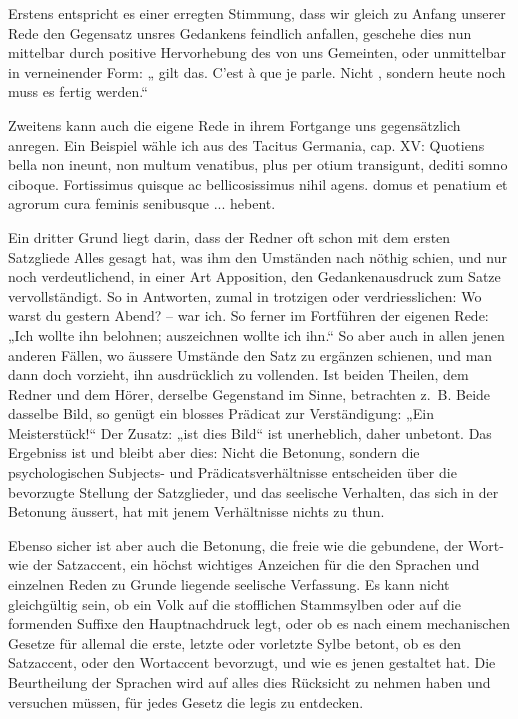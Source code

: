 \largerpage[2]Erstens entspricht es einer erregten Stimmung, dass wir gleich zu Anfang unserer Rede den Gegensatz unsres Gedankens feindlich anfallen, geschehe dies nun mittelbar durch positive Hervorhebung des von uns Gemeinten, oder unmittelbar in verneinender Form: „ gilt das. C’est à  que je parle. Nicht , sondern heute noch muss es fertig werden.“

Zweitens kann auch die eigene Rede in ihrem Fortgange uns gegensätzlich anregen. Ein Beispiel wähle ich aus des Tacitus Germania, cap. XV: Quotiens bella non ineunt, non multum venatibus, plus per otium transigunt, dediti somno ciboque. Fortissimus quisque ac bellicosissimus nihil agens.  domus et penatium et agrorum cura feminis senibusque ...  hebent.

Ein dritter Grund liegt darin, dass der Redner oft schon mit dem \label{fp.360} ersten Satzgliede Alles gesagt hat, was ihm den Umständen nach nöthig schien, und nur noch verdeutlichend, in einer Art Apposition, den Gedankenausdruck zum Satze vervollständigt. So in Antworten, zumal in trotzigen oder verdriesslichen: Wo warst du gestern Abend? –  war ich. So ferner im Fortführen der eigenen Rede: „Ich wollte ihn belohnen; auszeichnen wollte ich ihn.“ So aber auch in allen jenen anderen Fällen, wo äussere Umstände den Satz zu er\label{sp.376}gänzen schienen, und man dann doch vorzieht, ihn ausdrücklich zu vollenden. Ist beiden Theilen, dem Redner und dem Hörer, derselbe Gegenstand im Sinne, betrachten z.~B. Beide dasselbe Bild, so genügt ein blosses Prädicat zur Verständigung: „Ein Meisterstück!“ Der Zusatz: „ist dies Bild“ ist unerheblich, daher unbetont. Das Ergebniss ist und bleibt aber dies: Nicht die Betonung, sondern die psychologischen Subjects- und Prädicatsverhältnisse entscheiden über die bevorzugte Stellung der Satzglieder, und das seelische Verhalten, das sich in der Betonung äussert, hat mit jenem Verhältnisse nichts zu thun.

Ebenso sicher ist aber auch die Betonung, die freie wie die gebundene, der Wort- wie der Satzaccent, ein höchst wichtiges Anzeichen für die den Sprachen und  einzelnen Reden zu Grunde liegende seelische Verfassung. Es kann nicht gleichgültig sein, ob ein Volk auf die stofflichen Stammsylben oder auf die formenden Suffixe den Hauptnachdruck legt, oder ob es nach einem mechanischen Gesetze  für allemal die erste, letzte oder vorletzte Sylbe betont, ob es den Satzaccent, oder den Wortaccent bevorzugt, und wie es jenen gestaltet hat. Die Beurtheilung der Sprachen wird auf alles dies Rücksicht zu nehmen haben und versuchen müssen, für jedes Gesetz die  legis zu entdecken.


